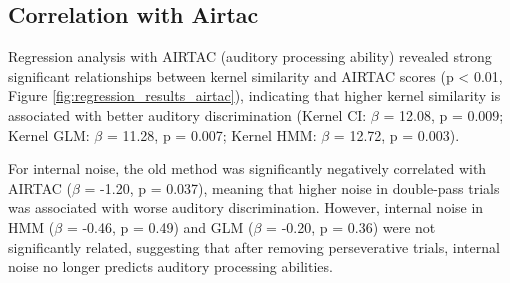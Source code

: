 \subsection {Correlation with Airtac} 
Regression analysis with AIRTAC (auditory processing ability) revealed strong significant relationships between kernel similarity and AIRTAC scores (p < 0.01, Figure \ref{fig:regression_results_airtac}), indicating that higher kernel similarity is associated with better auditory discrimination (Kernel CI: $\beta$ = 12.08, p = 0.009; Kernel GLM: $\beta$ = 11.28, p = 0.007; Kernel HMM: $\beta$ = 12.72, p = 0.003).

For internal noise, the old method was significantly negatively correlated with AIRTAC ($\beta$ = -1.20, p = 0.037), meaning that higher noise in double-pass trials was associated with worse auditory discrimination. However, internal noise in HMM ($\beta$ = -0.46, p = 0.49) and GLM ($\beta$ = -0.20, p = 0.36) were not significantly related, suggesting that after removing perseverative trials, internal noise no longer predicts auditory processing abilities.

